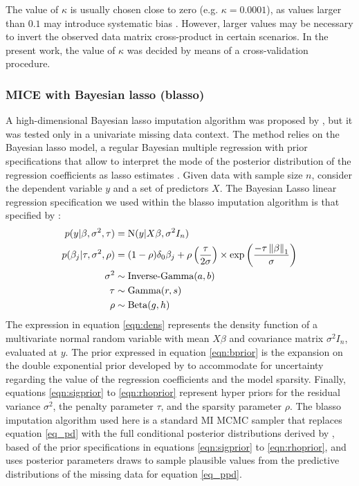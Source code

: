	The value of $\kappa$ is usually chosen close to zero (e.g. $\kappa = 0.0001$), as values larger than $0.1$ 
	may introduce systematic bias \citep[p. 68]{vanBuuren:2018}.
	However, larger values may be necessary to invert the observed data matrix cross-product in certain scenarios.
	In the present work, the value of $\kappa$ was decided by means of a cross-validation procedure.

\subsubsection{MICE with Bayesian lasso (blasso)}
	A high-dimensional Bayesian lasso imputation algorithm was proposed by \cite{zhaoLong:2016}, but it was tested only
	in a univariate missing data context.
	The method relies on the Bayesian lasso model, a regular Bayesian multiple regression with prior specifications 
	that allow to interpret the mode of the posterior distribution of the regression coefficients as lasso estimates 
	\citep{parkCasella:2008, hans:2009}.
	Given data with sample size $n$, consider the dependent variable $y$ and a set of predictors $X$.
	The Bayesian Lasso linear regression specification we used within the blasso imputation algorithm is that specified 
	by \cite{hans:2010}:
%
	\begin{align}
		p(y|\beta, \sigma^2, \tau) &= \textrm{N}(y|X\beta, \sigma^2I_n) \label{eqn:dens} \\
		p(\beta_j|\tau, \sigma^2, \rho) &= 
			(1 - \rho) \delta_0 \beta_j +
			\rho \left( \frac{\tau}{2\sigma} \right) \times 
			\textrm{exp} \left( \frac{-\tau \left\lVert\beta\right\rVert_1}{\sigma} \right) \label{eqn:bprior} \\
		\sigma^2 &\sim \textrm{Inverse-Gamma}(a, b) \label{eqn:sigprior} \\
		\tau &\sim \textrm{Gamma}(r, s) \label{eqn:tauprior} \\
		\rho &\sim \textrm{Beta}(g, h) \label{eqn:rhoprior}
	\end{align}
%	
	The expression in equation \eqref{eqn:dens} represents the density function of a multivariate normal random variable 
	with mean $X\beta$ and covariance matrix $\sigma^2I_n$, evaluated at $y$.
	The prior expressed in equation \eqref{eqn:bprior} is the expansion on the \cite{parkCasella:2008} double exponential 
	prior developed by \cite{hans:2010} to accommodate for uncertainty regarding the value of the regression coefficients 
	and the model sparsity.
	Finally, equations \eqref{eqn:sigprior} to \eqref{eqn:rhoprior} represent hyper priors for the residual variance 
	$\sigma^2$, the penalty parameter $\tau$, and the sparsity parameter $\rho$.
	The blasso imputation algorithm used here is a standard MI MCMC sampler that replaces equation \eqref{eq_pd} with the 
	full conditional posterior distributions derived by \citet{hans:2010}, based of the prior specifications in equations
	\eqref{eqn:sigprior} to \eqref{eqn:rhoprior}, and uses posterior parameters draws to sample plausible values from the 
	predictive distributions of the missing data for equation \eqref{eq_ppd}.

